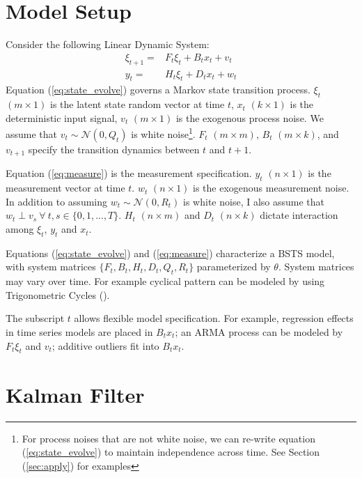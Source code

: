 \documentclass[10pt, titlepage]{article}
\numberwithin{equation}{section}
\begin{document}
\section{Model Setup} \label{sec:model_setup}
Consider the following Linear Dynamic System:
\begin{align}
    \xi_{t+1} = & F_{t}\xi_{t} + B_{t}x_t + v_t \label{eq:state_evolve} \\
    y_t = & H_t\xi_{t} + D_{t}x_t + w_t \label{eq:measure}
\end{align}
Equation (\ref{eq:state_evolve}) governs a Markov state transition process. $\xi_t$ $(m\times 1)$ is the latent state random vector at time $t$, $x_t$ $(k\times 1)$ is the deterministic input signal, $v_t$ $(m\times 1)$ is the exogenous process noise. We assume that $v_t\sim \mathcal{N}(0,Q_t)$ is white noise\footnote{For process noises that are not white noise, we can re-write equation (\ref{eq:state_evolve}) to maintain independence across time. See Section (\ref{sec:apply}) for examples}. $F_t$ $(m\times m)$, $B_t$ $(m\times k)$, and $v_{t+1}$ specify the transition dynamics between $t$ and $t+1$. 

Equation (\ref{eq:measure}) is the measurement specification. $y_t$ $(n\times 1)$ is the measurement vector at time $t$. $w_t$ $(n\times 1)$ is the exogenous measurement noise. In addition to assuming $w_t\sim \mathcal{N}(0, R_t)$ is white noise, I also assume that  $w_t \perp v_s \ \forall\  t,s\in\{0,1,...,T\}$. $H_t$ $(n\times m)$ and $D_t$ $(n\times k)$ dictate interaction among $\xi_t$, $y_t$ and $x_t$. 

Equations (\ref{eq:state_evolve}) and (\ref{eq:measure}) characterize a BSTS model, with system matrices $\{F_t, B_t, H_t, D_t, Q_t, R_t\}$ parameterized by $\theta$. System matrices may vary over time. For example cyclical pattern can be modeled by using Trigonometric Cycles (\cite{harvey_1985}). 

The subscript $t$ allows flexible model specification. For example, regression effects in time series models are placed in $B_t x_t$; an ARMA process can be modeled by $F_t\xi_t$ and $v_t$; additive outliers fit into $B_t x_t$.

\section{Kalman Filter} \label{sec:filter}
\end{document}
